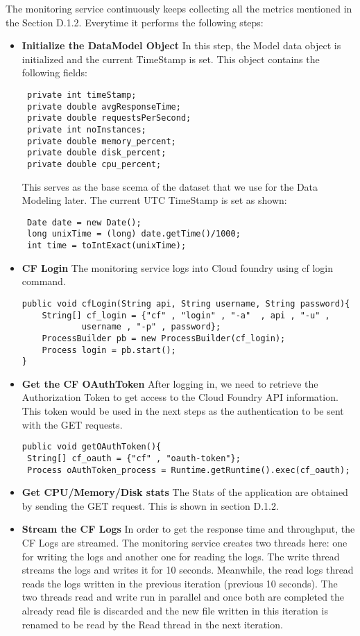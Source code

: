 \documentclass[article,type=msc,colorback,12pt,accentcolor=tud7b]{tudthesis}
\begin{document}
	The monitoring service continuously keeps collecting all the metrics mentioned in the Section D.1.2. Everytime it performs the following steps:
	\begin{itemize}
		\item{\textbf{Initialize the DataModel Object}} In this step, the Model data object is initialized and the current TimeStamp is set. This object contains the following fields: 
\begin{lstlisting}
 private int timeStamp;
 private double avgResponseTime;
 private double requestsPerSecond;
 private int noInstances;
 private double memory_percent;
 private double disk_percent;
 private double cpu_percent;
\end{lstlisting}
This serves as the base scema of the dataset that we use for the Data Modeling later. The current UTC TimeStamp is set as shown: 
\begin{lstlisting}
 Date date = new Date();			   
 long unixTime = (long) date.getTime()/1000;
 int time = toIntExact(unixTime);
\end{lstlisting}

\item{\textbf{CF Login}} The monitoring service logs into Cloud foundry using cf login command.
\begin{lstlisting}
public void cfLogin(String api, String username, String password){
	String[] cf_login = {"cf" , "login" , "-a"  , api , "-u" , 
			username , "-p" , password};
	ProcessBuilder pb = new ProcessBuilder(cf_login);
	Process login = pb.start();
}
\end{lstlisting}
\item{\textbf{Get the CF OAuthToken}} After logging in, we need to retrieve the Authorization Token to get access to the Cloud Foundry API information. This token would be used in the next steps as the authentication to be sent with the GET requests.
\begin{lstlisting}
public void getOAuthToken(){				
 String[] cf_oauth = {"cf" , "oauth-token"};			
 Process oAuthToken_process = Runtime.getRuntime().exec(cf_oauth);
\end{lstlisting}
		
\item{\textbf{Get CPU/Memory/Disk stats}} 
The Stats of the application are obtained by sending the GET request. This is shown in section D.1.2.
		
\item{\textbf{Stream the CF Logs}} In order to get the response time and throughput, the CF Logs are streamed. The monitoring service creates two threads here: one for writing the logs and another one for reading the logs. The write thread streams the logs and writes it for 10 seconds. Meanwhile, the read logs thread reads the logs written in the previous iteration (previous 10 seconds). The two threads read and write run in parallel and once both are completed the already read file is discarded and the new file written in this iteration is renamed to be read by the Read thread in the next iteration.


\end{itemize}
\end{document}
